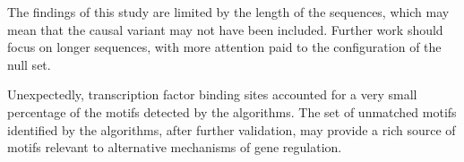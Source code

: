 \documentclass[12pt]{article}
\begin{document}
The findings of this study are limited by the length of the sequences, which may mean that the causal variant may not have been included. Further work should focus on longer sequences, with more attention paid to the configuration of the null set.

Unexpectedly, transcription factor binding sites accounted for a very small percentage of the motifs detected by the algorithms. The set of unmatched motifs identified by the algorithms, after further validation, may provide a rich source of motifs relevant to alternative mechanisms of gene regulation.


\clearpage


\end{document}
